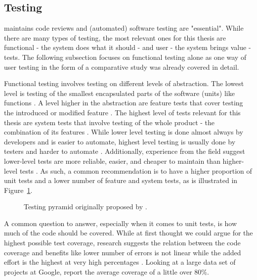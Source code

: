 \subsection{Testing}
\label{Literature-Software-Testing}

\textcite[Chapter~9]{Sommerville_2019} maintains code reviews and (automated) software testing are "essential".
While there are many types of testing, the most relevant ones for this thesis are functional - the system does what it should - and user - the system brings value - tests.
The following subsection focuses on functional testing alone as one way of user testing in the form of a comparative study was already covered in detail.

Functional testing involves testing on different levels of abstraction.
The lowest level is testing of the smallest encapsulated parts of the software (units) like functions \parencite[Chapter~9]{Sommerville_2019}.
A level higher in the abstraction are feature tests that cover testing the introduced or modified feature \parencite[Chapter~9]{Sommerville_2019}.
The highest level of tests relevant for this thesis are system tests that involve testing of the whole product - the combination of its features \parencite[Chapter~9]{Sommerville_2019}.
While lower level testing is done almost always by developers and is easier to automate, highest level testing is usually done by testers and harder to automate \parencite[Chapter~9]{Sommerville_2019}.
Additionally, experience from the field suggest lower-level tests are more reliable, easier, and cheaper to maintain than higher-level tests \parencites{cohn_succeeding_2010}{Wacker_2015}{Sommerville_2019}.
As such, a common recommendation is to have a higher proportion of unit tests and a lower number of feature and system tests, as is illustrated in Figure~\ref{fig:testing-pyramid}.

\begin{figure}[H]
    \centering
    
    \caption{Testing pyramid originally proposed by \textcite{cohn_succeeding_2010}.}
    \label{fig:testing-pyramid}
\end{figure}

A common question to answer, especially when it comes to unit tests, is how much of the code should be covered.
While at first thought we could argue for the highest possible test coverage, research suggests the relation between the code coverage and benefits like lower number of errors is not linear while the added effort is the highest at very high percentages \parencite{Antinyan2018}.
Looking at a large data set of projects at Google, \textcite{Ivankovic_2019} report the average coverage of a little over 80\%.
